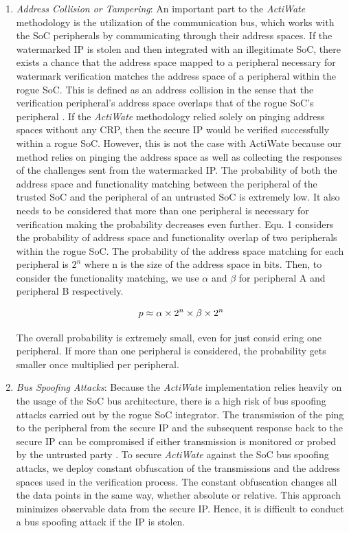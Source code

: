 \documentclass[onecolumn]{IEEEtran}
\begin{document}
\begin{enumerate}
	\item \textit{Address Collision or Tampering}: An important part to the
	\textit{ActiWate} methodology is the utilization of the communication bus,
	which works with the SoC peripherals by communicating through
	their address spaces. If the watermarked IP is stolen and then
	integrated with an illegitimate SoC, there exists a chance that the
	address space mapped to a peripheral necessary for watermark
	verification matches the address space of a peripheral within the
	rogue SoC. This is defined as an address collision in the sense that
	the verification peripheral’s address space overlaps that of the rogue
	SoC’s peripheral \cite{Harsh2008}. If the \textit{ActiWate} methodology relied solely on
	pinging address spaces without any CRP, then the secure IP would
	be verified successfully within a rogue SoC. However, this is not the case with ActiWate because our method relies on pinging the
	address space as well as collecting the responses of the challenges
	sent from the watermarked IP. The probability of both the address
	space and functionality matching between the peripheral of the trusted
	SoC and the peripheral of an untrusted SoC is extremely low. It also
	needs to be considered that more than one peripheral is necessary
	for verification making the probability decreases even further. Equ. 1
	considers the probability of address space and functionality overlap of
	two peripherals within the rogue SoC. The probability of the address
	space matching for each peripheral is $2^n$ where n is the size of the
	address space in bits. Then, to consider the functionality matching,
	we use $\alpha$ and $\beta$ for peripheral A and peripheral B respectively.
	
	\begin{equation}
		p \approx \alpha \times 2^n \times \beta \times 2^n\\
	\end{equation}
	
	 The overall probability is extremely small, even for just consid
	ering one peripheral. If more than one peripheral is considered, the
	probability gets smaller once multiplied per peripheral.
	
	\item  \textit{Bus Spoofing Attacks}: Because the \textit{ActiWate} implementation
	relies heavily on the usage of the SoC bus architecture, there is a high
	risk of bus spoofing attacks carried out by the rogue SoC integrator.
	The transmission of the ping to the peripheral from the secure IP and
	the subsequent response back to the secure IP can be compromised if
	either transmission is monitored or probed by the untrusted party \cite{Iehira2018}.
	To secure \textit{ActiWate} against the SoC bus spoofing attacks, we deploy
	constant obfuscation \cite{Bakken2004} of the transmissions and the address spaces
	used in the verification process. The constant obfuscation changes all
	the data points in the same way, whether absolute or relative. This
	approach minimizes observable data from the secure IP. Hence, it is
	difficult to conduct a bus spoofing attack if the IP is stolen.
\end{enumerate}
\end{document}
